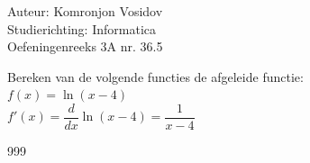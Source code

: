 \documentclass[a4paper]{article}
\begin{document}
	
	\noindent \large Auteur: Komronjon Vosidov \\
	\noindent \large Studierichting: Informatica\\
	\noindent \large Oefeningenreeks 3A nr. 36.5\\
	
	\medskip
	
	\normalsize
	Bereken van de volgende functies de afgeleide functie:\\
	
	$f(x) = \ln(x - 4)$\\
	
	$f'(x) = \dfrac{d}{dx} \ln(x - 4) = \dfrac{1}{x - 4}$
	
	
	\begin{thebibliography}{999}
	\end{thebibliography}	
	
\end{document}

